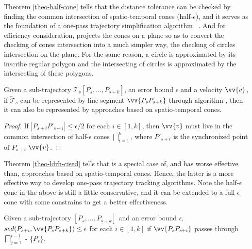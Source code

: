 Theorem \ref{theo-half-cone} tells that the \sed distance tolerance can be checked by finding the common intersection of spatio-temporal cones (half-$\epsilon$), and it serves as the foundation of a one-pass trajectory simplification algorithm \cised~\cite{Lin:Cised}. And for efficiency consideration, \cised projects the cones on a plane so as to convert the checking of cones intersection into a much simpler way, \ie the checking of circles intersection on the plane. For the same reason, a circle is approximated by its inscribe regular polygon and the intersecting of circles is approximated by the intersecting of these polygons.


\begin{theorem}
\label{theo-ldrh-cised}
Given a sub-trajectory $\dddot{\mathcal{T}}_s[P_s,...,P_{s+k}]$, an error bound $\epsilon$ and a velocity $\vv{v}$, if $\dddot{\mathcal{T}}_s$ can be represented by line segment $\vv{P_sP_{s+k}}$ through algorithm \ldrh, then it can also be represented by approaches based on spatio-temporal cones.
\end{theorem}

\begin{proof}

If $|P_{s+i}P'_{s+i}|\le \epsilon/2$ for each $i \in [1,k]$, then $\vv{v}$ must live in the common intersection of half-$\epsilon$ cones $\bigsqcap_{i=1}^{k}$, where $P'_{s+i}$ is the synchronized point of $P_{s+i}$ \wrt $\vv{v}$.
\end{proof}

Theorem \ref{theo-ldrh-cised} tells that \ldrh is a special case of, and has worse effective than, approaches based on spatio-temporal cones. Hence, the latter is a more effective way to develop one-pass trajectory tracking algorithms. 
Note the half-$\epsilon$ cone in the above is still a little conservative, and it can be extended to a full-$\epsilon$ cone with some constrains to get a better effectiveness.


\begin{theorem}
	\label{theo-full-cone}
	Given a sub-trajectory $[P_s,...,P_{s+k}]$ and an error bound $\epsilon$, $sed(P_{s+i}, \vv{P_sP_{s+k}})\le \epsilon$ for each $i \in [1,k]$ if $\vv{P_sP_{s+i}}$ passes through $\bigsqcap_{j=1}^{i-1}$ - \{$P_s$\}.
\end{theorem}

